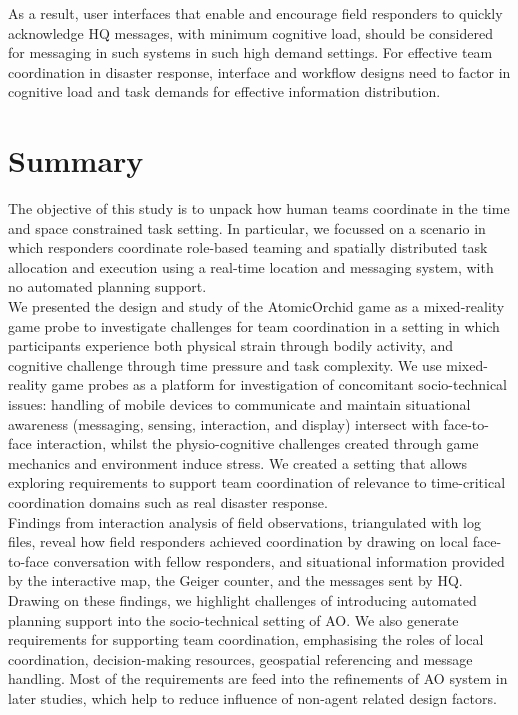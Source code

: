 
As a result, user interfaces that enable and encourage field responders to quickly acknowledge HQ messages, with minimum cognitive load, should be considered for messaging in such systems in such high demand settings. For effective team coordination in disaster response, interface and workflow designs need to factor in cognitive load and task demands for effective information distribution.\\


\section{Summary}
The objective of this study is to unpack how human teams coordinate in the time and space constrained task setting. In particular, we focussed on a scenario in which responders coordinate role-based teaming and spatially distributed task allocation and execution using a real-time location and messaging system, with no automated planning support.\\

We presented the design and study of the AtomicOrchid game as a mixed-reality game probe to investigate challenges for team coordination in a setting in which participants experience both physical strain through bodily activity, and cognitive challenge through time pressure and task complexity. We use mixed-reality game probes as a platform for investigation of concomitant socio-technical issues: handling of mobile devices to communicate and maintain situational awareness (messaging, sensing, interaction, and display) intersect with face-to-face interaction, whilst the physio-cognitive challenges created through game mechanics and environment induce stress. We created a setting that allows exploring requirements to support team coordination of relevance to time-critical coordination domains such as real disaster response.\\

Findings from interaction analysis of field observations, triangulated with log files, reveal how field responders achieved coordination by drawing on local face-to-face conversation with fellow responders, and situational information provided by the interactive map, the Geiger counter, and the messages sent by HQ. Drawing on these findings, we highlight challenges of introducing automated planning support into the socio-technical setting of \ac{AO}. We also generate requirements for supporting team coordination, emphasising the roles of local coordination, decision-making resources, geospatial referencing and message handling. Most of the requirements are feed into the refinements of \ac{AO} system in later studies, which help to reduce influence of non-agent related design factors. \\

